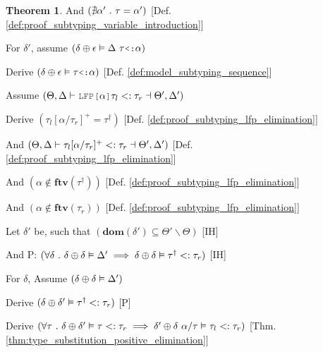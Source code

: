 \documentclass[acmsmall]{acmart}
\theoremstyle{definition}
\newtheorem{theorem}{Theorem}[section]
\begin{document}
\begin{theorem}
  \item \I \N And $(
    \nexists \alpha' \ .\  \tau = \alpha'
  )$ [Def. \ref{def:proof_subtyping_variable_introduction}]

  \item \I \N For $\delta'$, assume $(
    \delta \oplus \epsilon \satisfies \Delta\ \tau \J{<:} \alpha
  )$ 
  \item \I\I \N Derive $(
    \delta \oplus \epsilon \satisfies \tau \J{<:} \alpha
  )$ [Def. \ref{def:model_subtyping_sequence}]


  \item \N Assume $(
    \Theta, \Delta \entails 
    \J{LFP[}\alpha\J{]}\tau_l \subtypes \tau_r 
    \given \Theta', \Delta' 
  )$
  \item \I \N Derive $(
    \tau_l[\alpha\slash\tau_r]^+ = \tau^\dagger 
  )$ [Def. \ref{def:proof_subtyping_lfp_elimination}]
  \item \I \N And $(
    \Theta, \Delta \vdash 
    \tau_l[\alpha\slash\tau_r]^+ <: \tau_r \dashv 
    \Theta', \Delta'
  )$ [Def. \ref{def:proof_subtyping_lfp_elimination}]
  \item \I \N And $(
    \alpha \not\in \textbf{ftv}(\tau^\dagger)
  )$ [Def. \ref{def:proof_subtyping_lfp_elimination}]
  \item \I \N And $(
    \alpha \not\in \textbf{ftv}(\tau_r)
  )$ [Def. \ref{def:proof_subtyping_lfp_elimination}]

  \item \I \N Let $\delta'$ be, such that $(
    \textbf{dom}(\delta') \subseteq \Theta' \backslash \Theta
  )$ [IH]

  \item \I \N And P: $(
    \forall \delta \ .\ 
    \delta \oplus \delta \vDash \Delta'
    \implies
    \delta \oplus \delta \vDash \tau^\dagger <: \tau_r
  )$ [IH]


  \item \I \N For $\delta$, Assume $(
    \delta \oplus \delta \vDash \Delta'
  )$

  \item \I\I \N Derive $(
    \delta \oplus \delta' \vDash \tau^\dagger <: \tau_r
  )$ [P]

  \item \I\I \N Derive $(
    \forall \tau \ .\  \delta \oplus \delta' \vDash \tau <: \tau_r \implies \delta' \oplus \delta\ \alpha \slash \tau \vDash \tau_l <: \tau_r
  )$ [Thm. \ref{thm:type_substitution_positive_elimination}]


\end{theorem}
\end{document}
